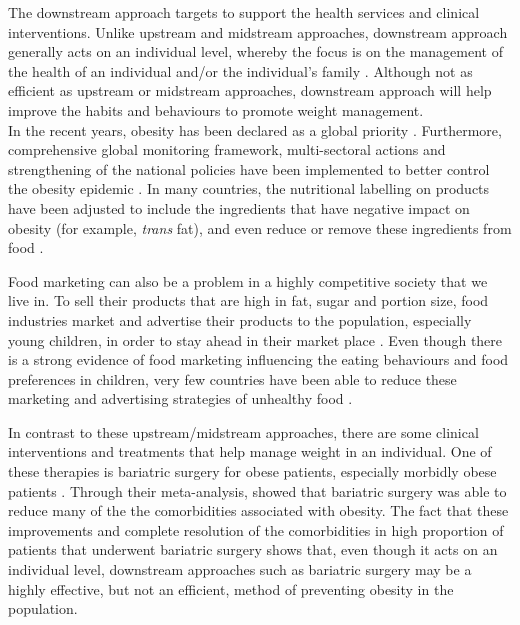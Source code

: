 The downstream approach targets to support the health services and clinical interventions.
Unlike upstream and midstream approaches, downstream approach generally acts on an individual level, whereby the focus is on the management of the health of an individual and/or the individual's family \citet{Sacks2009}.
Although not as efficient as upstream or midstream approaches, downstream approach will help improve the habits and behaviours to promote weight management.\\

\noindent
In the recent years, obesity has been declared as a global priority \citep{Malik2013}.
Furthermore, comprehensive global monitoring framework, multi-sectoral actions and strengthening of the national policies have been implemented to better control the obesity epidemic \citep{Malik2013}.
In many countries, the nutritional labelling on products have been adjusted to include the ingredients that have negative impact on obesity (for example, \textit{trans} fat), and even reduce or remove these ingredients from food \citep{Malik2013}.

Food marketing can also be a problem in a highly competitive society that we live in.
To sell their products that are high in fat, sugar and portion size, food industries market and advertise their products to the population, especially young children, in order to stay ahead in their market place \citep{Chan2010, Malik2013}.
Even though there is a strong evidence of food marketing influencing the eating behaviours and food preferences in children, very few countries have been able to reduce these marketing and advertising strategies of unhealthy food \citep{Hawkes2007a, Malik2013}.

In contrast to these upstream/midstream approaches, there are some clinical interventions and treatments that help manage weight in an individual.
One of these therapies is bariatric surgery for obese patients, especially morbidly obese patients \citep{Buchwald2004}.
Through their meta-analysis, \citet{Buchwald2004} showed that bariatric surgery was able to reduce many of the the comorbidities associated with obesity.
The fact that these improvements and complete resolution of the comorbidities in high proportion of patients that underwent bariatric surgery shows that, even though it acts on an individual level, downstream approaches such as bariatric surgery may be a highly effective, but not an efficient, method of preventing obesity in the population.\\

